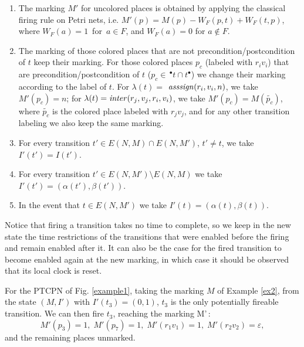 {\begin{enumerate}
\item The marking $M'$ for uncolored places is obtained by applying the classical firing
rule on Petri nets, i.e. \mbox{$M'(p) = M(p) - W_F(p,t) +
W_F(t,p)$,} where \mbox{$W_F(a)=1$ for $a\in F$,} and
\mbox{$W_F(a)=0$} for $a\not\in F$.
%
\item The marking of those colored places that are not
precondition/postcondition of $t$ keep their marking. For
those colored places $p_c$ (labeled with $r_iv_i$) that are
precondition/postcondition of $t$ ($p_c \in \,^\bullet t \cap
t^\bullet$) we change their marking according to the label of $t$.
 For \mbox{$\lambda(t)=$} \mbox{${\it
asssign}(r_i,v_i,n)$,} we take \mbox{$M'(p_c)=n$;} for
\mbox{$\lambda(t)={\it inter}(r_j,v_j,r_i,v_i)$}, we take
\mbox{$M'(p_c)=M(\widetilde{p_c})$,} where $\widetilde{p_c}$ is the
colored place labeled with $r_jv_j$, and for any other transition
labeling we also keep the same marking.
%
\item For every transition $t' \in E(N,M) \cap E(N,M')$, $t'\neq t$,
we take $I'(t') = I(t')$.
%
\item For every transition $t' \in E(N,M') \setminus E(N,M)$
we take $I'(t') = (\alpha(t'),\beta(t'))$.
%
\item In the event that $t \in E(N,M')$ we take
$I'(t) = (\alpha(t),\beta(t))$.
%
\end{enumerate}

\edfn

Notice that firing a transition takes no time to complete, so we
keep in the new state the time restrictions of the transitions that
were enabled before the firing and remain enabled after it. It can
also be the case for the fired transition to become enabled again at
the new marking, in which case it should be observed 
that its local clock is reset.
%

\bex\label{ex5} For the PTCPN of Fig. \ref{example1}, taking the
marking $M$ of  Example \ref{ex2},  from the state $(M,I')$ with\;
\(I'(t_3)=(0,1)\),  $t_3$ is the only potentially fireable
transition.  We can then fire $t_3$, reaching the marking M'\,:
%
\[M'(p_3)=1, \; M'(p_7)=1, \; M'(r_1v_1)=1, \; M'(r_2v_2)=\varepsilon ,\]
and the remaining places unmarked.
%
\eex


} %
